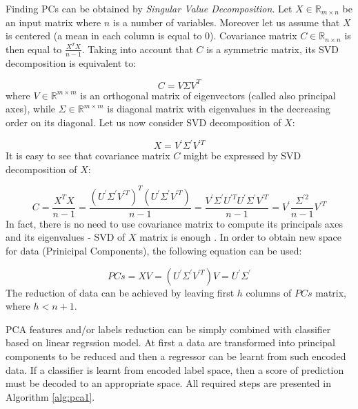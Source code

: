 Finding PCs can be obtained by \textit{Singular Value Decomposition}. Let $X \in \mathbb{R}_{m \times n}$ be an input matrix where $n$ is a number of variables. Moreover let us assume that $X$ is centered (a mean in each column is equal to $0$). Covariance matrix $C \in \mathbb{R}_{n \times n}$ is then equal to $\frac{X^TX}{n-1}$. Taking into account that $C$ is a symmetric matrix, its SVD decomposition is equivalent to:

\begin{equation}\label{eq:pca1}
    C=V\Sigma{V^T}
\end{equation}
where $V \in \mathbb{R}^{m \times m}$ is an orthogonal matrix of eigenvectors (called also principal axes), while $\Sigma \in \mathbb{R}^{m \times m}$ is diagonal matrix with eigenvalues in the decreasing order on its diagonal. 
Let us now consider SVD decomposition of $X$:

\begin{equation}\label{eq:pca2}
    X=V^{'}\Sigma^{'}{V^{'T}}
\end{equation}
It is easy to see that covariance matrix $C$ might be expressed by SVD decomposition of $X$:

\begin{equation}\label{eq:pca3}
    C=\frac{X^TX}{n-1} = \frac{(U^{\prime}\Sigma^{\prime}V^{\prime T})^T(U^{\prime}\Sigma^{\prime}V^{\prime T})}{n-1} = \frac{V^{\prime}\Sigma^{\prime}U^{\prime T}U^{\prime}\Sigma^{\prime}V^{\prime T}}{n-1} = V^{\prime}\frac{\Sigma^{\prime 2}}{n-1}V^{\prime T} 
\end{equation}
In fact, there is no need to use covariance matrix to compute its principals axes and its eigenvalues - SVD of $X$ matrix is enough \cite{Jolliffe}. In order to obtain new space for data (Prinicipal Components), the following equation can be used:

\begin{equation}\label{eq:pca4}
    PCs = XV = (U^{'}\Sigma^{'}V^{'T})V = U^{'}\Sigma^{'} 
\end{equation}
The reduction of data can be achieved by leaving first $h$ columns of $PCs$ matrix, where $h<n+1$.

PCA features and/or labels reduction can be simply combined with classifier based on linear regrssion model. At first a data are transformed into principal components to be reduced and then a regressor can be learnt from such encoded data. If a classifier is learnt from encoded label space, then a score of prediction must be decoded to an appropriate space. All required steps are presented in Algorithm \ref{alg:pca1}.

